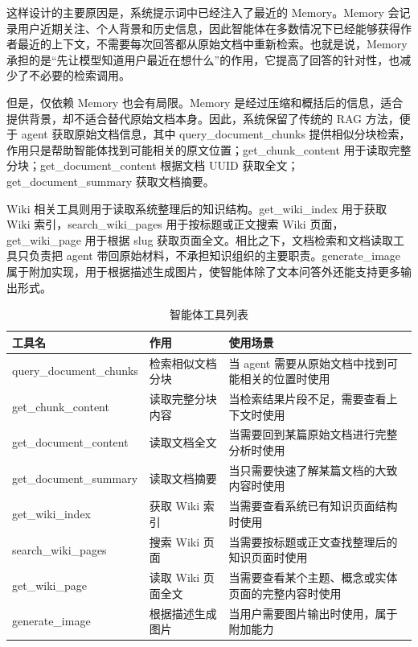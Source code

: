 这样设计的主要原因是，系统提示词中已经注入了最近的 Memory。Memory 会记录用户近期关注、个人背景和历史信息，因此智能体在多数情况下已经能够获得作者最近的上下文，不需要每次回答都从原始文档中重新检索。也就是说，Memory 承担的是“先让模型知道用户最近在想什么”的作用，它提高了回答的针对性，也减少了不必要的检索调用。

但是，仅依赖 Memory 也会有局限。Memory 是经过压缩和概括后的信息，适合提供背景，却不适合替代原始文档本身。因此，系统保留了传统的 RAG 方法，便于 agent 获取原始文档信息，其中 query\_document\_chunks 提供相似分块检索，作用只是帮助智能体找到可能相关的原文位置；get\_chunk\_content 用于读取完整分块；get\_document\_content 根据文档 UUID 获取全文；get\_document\_summary 获取文档摘要。

Wiki 相关工具则用于读取系统整理后的知识结构。get\_wiki\_index 用于获取 Wiki 索引，search\_wiki\_pages 用于按标题或正文搜索 Wiki 页面，get\_wiki\_page 用于根据 slug 获取页面全文。相比之下，文档检索和文档读取工具只负责把 agent 带回原始材料，不承担知识组织的主要职责。generate\_image 属于附加实现，用于根据描述生成图片，使智能体除了文本问答外还能支持更多输出形式。

\begin{table}[htbp]
  \centering
  \caption{智能体工具列表}
  \label{T.agent_tools}
  \small
  \begin{tabular}{p{}p{}p{}}
    \hline
    工具名 & 作用 & 使用场景 \\
    \hline
    query\_document\_chunks & 检索相似文档分块 & 当 agent 需要从原始文档中找到可能相关的位置时使用 \\
    get\_chunk\_content & 读取完整分块内容 & 当检索结果片段不足，需要查看上下文时使用 \\
    get\_document\_content & 读取文档全文 & 当需要回到某篇原始文档进行完整分析时使用 \\
    get\_document\_summary & 读取文档摘要 & 当只需要快速了解某篇文档的大致内容时使用 \\
    get\_wiki\_index & 获取 Wiki 索引 & 当需要查看系统已有知识页面结构时使用 \\
    search\_wiki\_pages & 搜索 Wiki 页面 & 当需要按标题或正文查找整理后的知识页面时使用 \\
    get\_wiki\_page & 读取 Wiki 页面全文 & 当需要查看某个主题、概念或实体页面的完整内容时使用 \\
    generate\_image & 根据描述生成图片 & 当用户需要图片输出时使用，属于附加能力 \\
    \hline
  \end{tabular}
\end{table}


